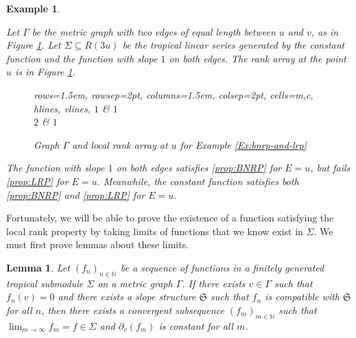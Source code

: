 \documentclass{amsart}
\newtheorem{lemma}[theorem]{Lemma}
\newtheorem{varexample}[theorem]{Example}
\newenvironment{example}{\begin{varexample}
		\begin{normalfont}}{\end{normalfont}
\end{varexample}}
\begin{document}
	\begin{example}
		\label{Ex:bnrp-and-lrp}
		Let $\Gamma$ be the metric graph with two edges of equal length between $u$ and $v$, as in Figure \ref{Fig:bnrp-and-lrp}. Let $\Sigma \subseteq R(3u)$ be the tropical linear series generated by the constant function and the function with slope $1$ on both edges. The rank array at the point $u$ is in Figure \ref{Fig:bnrp-and-lrp}.
		
		\begin{figure}
			\centering
			
			\begin{minipage}[c]{0.35\textwidth}
				\centering
			\end{minipage}
			\begin{minipage}[c]{0.2\textwidth}
				\centering
				\begin{tblr}{
						rows={1.5em, rowsep=2pt},
						columns={1.5em, colsep=2pt},
						cells={m,c},
						hlines,
						vlines,
					}
					$1$ & $1$ \\
					$2$ & $1$ \\
				\end{tblr}
			\end{minipage}
			
			\caption{Graph $\Gamma$ and local rank array at $u$ for Example \ref{Ex:bnrp-and-lrp}}
			\label{Fig:bnrp-and-lrp}
		\end{figure}
		
		The function with slope $1$ on both edges satisfies \ref{prop:BNRP} for $E = u$, but fails \ref{prop:LRP} for $E = u$. Meanwhile, the constant function satisfies both \ref{prop:BNRP} and \ref{prop:LRP} for $E = u$.
	\end{example}
	
	Fortunately, we will be able to prove the existence of a function satisfying the local rank property by taking limits of functions that we know exist in $\Sigma$. We must first prove lemmas about these limits.
	
	\begin{lemma}
		\label{Lem:Limits-1}
		Let $(f_n)_{n \in \mathbb{N}}$ be a sequence of functions in a finitely generated tropical submodule $\Sigma$ on a metric graph $\Gamma$. If there exists $v \in \Gamma$ such that $f_n(v) = 0$ and there exists a slope structure $\mathfrak{S}$ such that $f_n$ is compatible with $\mathfrak{S}$ for all $n$, then there exists a convergent subsequence $(f_m)_{m \in \mathbb{N}}$ such that $\displaystyle \lim_{m \to \infty} f_m = f \in \Sigma$ and $\partial_v(f_m)$ is constant for all $m$.
	\end{lemma}
	
\end{document}

